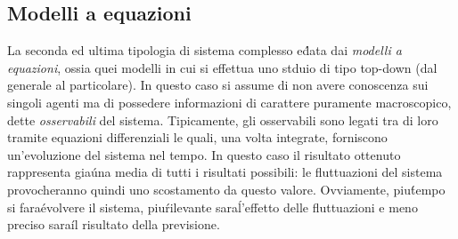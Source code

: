 \documentclass[12pt, a4paper]{book}
\theoremstyle{theorem}
\begin{document}
			\subsection{Modelli a equazioni}
				La seconda ed ultima tipologia di sistema complesso e\' data dai \emph{modelli a equazioni}, ossia quei modelli in cui si effettua uno stduio di tipo top-down (dal generale al particolare).
				In questo caso si assume di non avere conoscenza sui singoli agenti ma di possedere informazioni di carattere puramente macroscopico, dette \emph{osservabili} del sistema.
				Tipicamente, gli osservabili sono legati tra di loro tramite equazioni differenziali le quali, una volta integrate, forniscono un'evoluzione del sistema nel tempo.
				In questo caso il risultato ottenuto rappresenta gia\' una media di tutti i risultati possibili: le fluttuazioni del sistema provocheranno quindi uno scostamento da questo valore.
				Ovviamente, piu\' tempo si fara\' evolvere il sistema, piu\' rilevante sara\' l'effetto delle fluttuazioni e meno preciso sara\' il risultato della previsione.
\end{document}
